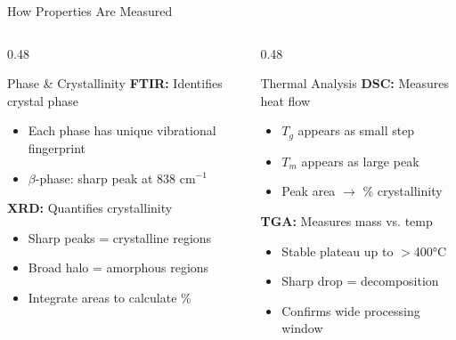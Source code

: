 \documentclass[aspectratio=169]{beamer}
\begin{document}
\begin{frame}{How Properties Are Measured}
    \begin{columns}[T]
        \begin{column}{0.48\textwidth}
            \begin{block}{Phase \& Crystallinity}
                \textbf{FTIR:} Identifies crystal phase
                \begin{itemize}\small
                    \item Each phase has unique vibrational fingerprint
                    \item $\beta$-phase: sharp peak at 838 cm$^{-1}$
                \end{itemize}
                
                \textbf{XRD:} Quantifies crystallinity
                \begin{itemize}\small
                    \item Sharp peaks = crystalline regions
                    \item Broad halo = amorphous regions
                    \item Integrate areas to calculate \%
                \end{itemize}
            \end{block}
        \end{column}
        
        \begin{column}{0.48\textwidth}
            \begin{block}{Thermal Analysis}
                \textbf{DSC:} Measures heat flow
                \begin{itemize}\small
                    \item $T_g$ appears as small step
                    \item $T_m$ appears as large peak
                    \item Peak area $\rightarrow$ \% crystallinity
                \end{itemize}
                
                \textbf{TGA:} Measures mass vs. temp
                \begin{itemize}\small
                    \item Stable plateau up to $>$400\si{\celsius}
                    \item Sharp drop = decomposition
                    \item Confirms wide processing window
                \end{itemize}
            \end{block}
        \end{column}
    \end{columns}
\end{frame}
\end{document}
